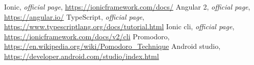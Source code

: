 \begin{thebibliography}{99999}
\singlespace\normalsize

 Ionic, \textit{ official page}, \url{https://ionicframework.com/docs/}
 Angular 2, \textit{ official page}, \url{https://angular.io/}
 TypeScript, \textit{ official page}, \url{https://www.typescriptlang.org/docs/tutorial.html}
 Ionic cli, \textit{ official page}, \url{https://ionicframework.com/docs/v2/cli}
 Promodoro, \url{https://en.wikipedia.org/wiki/Pomodoro_Technique}
 Android studio, \url{https://developer.android.com/studio/index.html}
\end{thebibliography}